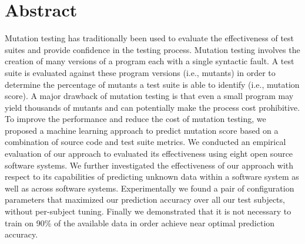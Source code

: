 \chapter*{Abstract}
Mutation testing has traditionally been used to evaluate the effectiveness of test suites and provide confidence in the testing process. Mutation testing involves the creation of many versions of a program each with a single syntactic fault. A test suite is evaluated against these program versions (i.e., mutants) in order to determine the percentage of mutants a test suite is able to identify (i.e., mutation score). A major drawback of mutation testing is that even a small program may yield thousands of mutants and can potentially make the process cost prohibitive. To improve the performance and reduce the cost of mutation testing, we proposed a machine learning approach to predict mutation score based on a combination of source code and test suite metrics. We conducted an empirical evaluation of our approach to evaluated its effectiveness using eight open source software systems. We further investigated the effectiveness of our approach with respect to its capabilities of predicting unknown data within a software system as well as across software systems. Experimentally we found a pair of configuration parameters that maximized our prediction accuracy over all our test subjects, without per-subject tuning. Finally we demonstrated that it is not necessary to train on 90\% of the available data in order achieve near optimal prediction accuracy.
